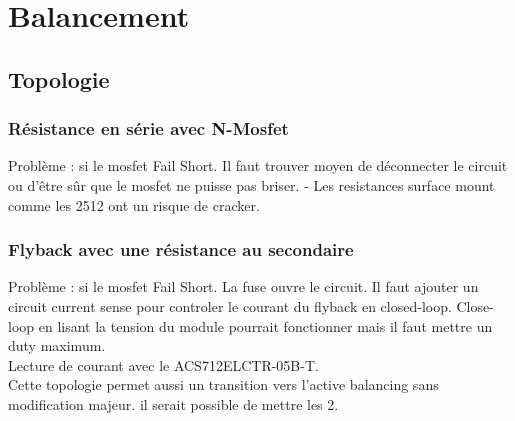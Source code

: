 

\section{Balancement}
	\subsection{Topologie}
		\subsubsection{R\'{e}sistance en s\'{e}rie avec N-Mosfet}
	Probl\`{e}me : si le mosfet Fail Short. Il faut trouver moyen de d\'{e}connecter le circuit ou d'\^{e}tre s\^{u}r que le mosfet ne puisse pas briser.
	- Les resistances surface mount comme les 2512 ont un risque de cracker.
		\subsubsection{Flyback avec une r\'{e}sistance au secondaire}
	Probl\`{e}me : si le mosfet Fail Short. La fuse ouvre le circuit. Il faut ajouter un circuit current sense pour controler le courant du flyback en closed-loop. Close-loop en lisant la tension du module pourrait fonctionner mais il faut mettre un duty maximum. 
	\\Lecture de courant avec le ACS712ELCTR-05B-T.  \\
	Cette topologie permet aussi un transition vers l'active balancing sans modification majeur. il serait possible de mettre les 2.